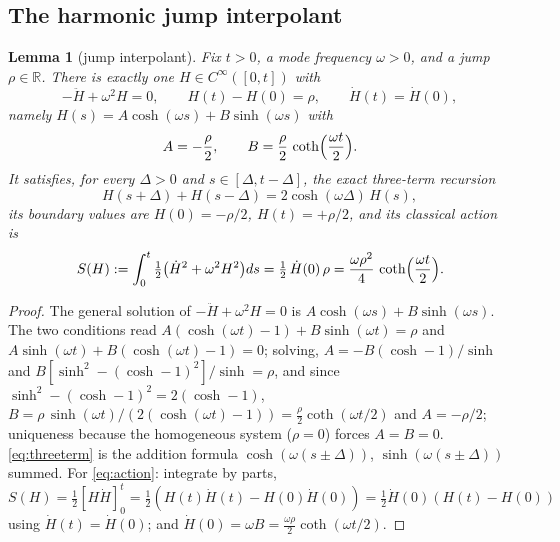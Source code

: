 \documentclass[11pt,a4paper]{article}
\theoremstyle{plain}
\newtheorem{lemma}[theorem]{Lemma}
\theoremstyle{definition}
\newcommand{\R}{\mathbb{R}}
\DeclareMathOperator{\ch}{cosh}
\DeclareMathOperator{\sh}{sinh}
\DeclareMathOperator{\cth}{coth}
\begin{document}
\subsection{The harmonic jump interpolant}

\begin{lemma}[jump interpolant]\label{lem:interp}
Fix $t>0$, a mode frequency $\omega>0$, and a jump $\rho\in\R$. There is
exactly one $H\in C^\infty([0,t])$ with
\[
 -\ddot H+\omega^2H=0,\qquad H(t)-H(0)=\rho,\qquad \dot H(t)=\dot H(0),
\]
namely $H(s)=A\ch(\omega s)+B\sh(\omega s)$ with
\begin{equation}
 A=-\frac\rho2,\qquad
 B=\frac\rho2\,\cth\Bigl(\frac{\omega t}2\Bigr).
 \label{eq:AB}
\end{equation}
It satisfies, for every $\Delta>0$ and $s\in[\Delta,t-\Delta]$, the
\emph{exact} three-term recursion
\begin{equation}
 H(s+\Delta)+H(s-\Delta)=2\ch(\omega\Delta)\,H(s),
 \label{eq:threeterm}
\end{equation}
its boundary values are $H(0)=-\rho/2$, $H(t)=+\rho/2$, and its classical
action is
\begin{equation}
 S(H):=\int_0^t\tfrac12\bigl(\dot H^2+\omega^2H^2\bigr)ds
 =\tfrac12\,\dot H(0)\,\rho
 =\frac{\omega\rho^2}4\,\cth\Bigl(\frac{\omega t}2\Bigr).
 \label{eq:action}
\end{equation}
\end{lemma}

\begin{proof}
The general solution of $-\ddot H+\omega^2H=0$ is
$A\ch(\omega s)+B\sh(\omega s)$. The two conditions read
$A(\ch(\omega t)-1)+B\sh(\omega t)=\rho$ and
$A\sh(\omega t)+B(\ch(\omega t)-1)=0$; solving,
$A=-B(\ch-1)/\sh$ and
$B[\sh^2-(\ch-1)^2]/\sh=\rho$, and since
$\sh^2-(\ch-1)^2=2(\ch-1)$,
$B=\rho\,\sh(\omega t)/(2(\ch(\omega t)-1))=\tfrac\rho2\cth(\omega t/2)$
and $A=-\rho/2$; uniqueness because the homogeneous system
($\rho=0$) forces $A=B=0$. \eqref{eq:threeterm} is the addition formula
$\ch(\omega(s\pm\Delta))$, $\sh(\omega(s\pm\Delta))$ summed. For
\eqref{eq:action}: integrate by parts,
$S(H)=\tfrac12[H\dot H]_0^t=\tfrac12(H(t)\dot H(t)-H(0)\dot H(0))
=\tfrac12\dot H(0)(H(t)-H(0))$ using $\dot H(t)=\dot H(0)$; and
$\dot H(0)=\omega B=\tfrac{\omega\rho}2\cth(\omega t/2)$.
\end{proof}
\end{document}

